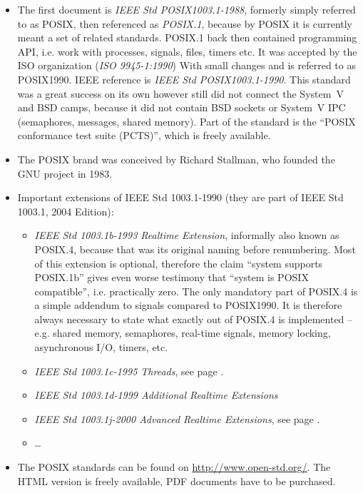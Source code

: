 
\begin{itemize}
\item The first document is \emph{IEEE Std POSIX1003.1-1988}, formerly simply
referred to as POSIX, then referenced as \emph{POSIX.1}, because by POSIX it is
currently meant a set of related standards. POSIX.1 back then contained
programming API, i.e. work with processes, signals, files, timers etc.
It was accepted by the ISO organization (\emph{ISO 9945-1:1990}) With small
changes and is referred to as POSIX1990. IEEE reference is
\emph{IEEE Std POSIX1003.1-1990}. This standard was a great success on its own
however still did not connect the System~V and BSD camps, because it did not
contain BSD sockets or System~V IPC (semaphores, messages, shared memory).
Part of the standard is the ``POSIX conformance test suite (PCTS)'', which is
freely available.
\item The POSIX brand was conceived by Richard Stallman, who founded the GNU
project in 1983.
\item Important extensions of IEEE Std 1003.1-1990 (they are part of IEEE Std
1003.1, 2004 Edition):
\begin{itemize}
\item \emph{IEEE Std 1003.1b-1993 Realtime Extension}, informally also known as
POSIX.4, because that was its original naming before renumbering.  Most of this
extension is optional, therefore the claim ``system supports POSIX.1b'' gives
even worse testimony that ``system is POSIX compatible'', i.e.  practically
zero. The only mandatory part of POSIX.4 is a simple addendum to signals
compared to POSIX1990. It is therefore always necessary to state what exactly
out of POSIX.4 is implemented -- e.g. shared memory, semaphores, real-time
signals, memory locking, asynchronous I/O, timers, etc.
\item \emph{IEEE Std 1003.1c-1995 Threads}, see page \pageref{POSIXTHREADS}.
\item \emph{IEEE Std 1003.1d-1999 Additional Realtime Extensions}
\item \emph{IEEE Std 1003.1j-2000 Advanced Realtime Extensions}, see page
\pageref{RWLOCKS}.
\item \dots
\end{itemize}
\item The POSIX standards can be found on \url{http://www.open-std.org/}.
The HTML version is freely available, PDF documents have to be purchased.
\end{itemize}


